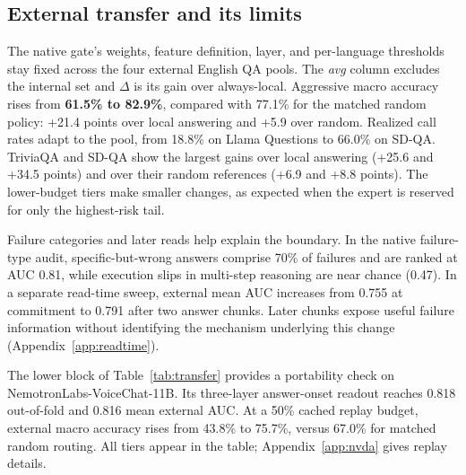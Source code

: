 \subsection{External transfer and its limits}
\label{sec:transfer}
\label{sec:transfer-neg}
The native gate's weights, feature definition, layer, and per-language
thresholds stay fixed across the four external English QA pools. The
\emph{avg} column excludes the internal set and $\Delta$ is its gain over
always-local. Aggressive macro accuracy rises from \textbf{61.5\% to
82.9\%}, compared with 77.1\% for the matched random policy: +21.4 points
over local answering and +5.9 over random. Realized call rates adapt to
the pool, from 18.8\% on Llama Questions to 66.0\% on SD-QA. TriviaQA and
SD-QA show the largest gains over local answering (+25.6 and +34.5 points)
and over their random references (+6.9 and +8.8 points). The lower-budget
tiers make smaller changes, as expected when the expert is reserved for
only the highest-risk tail.

Failure categories and later reads help explain the boundary. In the
native failure-type audit, specific-but-wrong answers comprise
70\% of failures and are ranked at AUC 0.81, while execution slips
in multi-step reasoning are near chance (0.47). In a separate
read-time sweep, external mean AUC increases from 0.755 at commitment
to 0.791 after two answer chunks. Later chunks expose useful failure
information without identifying the mechanism underlying this change
(Appendix~\ref{app:readtime}).

The lower block of Table~\ref{tab:transfer} provides a portability check on
NemotronLabs-VoiceChat-11B. Its three-layer answer-onset readout reaches 0.818
out-of-fold and 0.816 mean external AUC. At a 50\% cached replay budget,
external macro accuracy rises from 43.8\% to 75.7\%, versus 67.0\% for matched
random routing. All tiers appear in the table; Appendix~\ref{app:nvda}
gives replay details.
